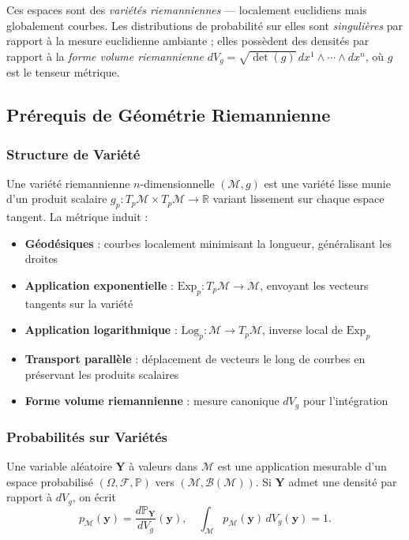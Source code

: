 \documentclass[11pt,a4paper]{article}
\begin{document}
Ces espaces sont des \textit{variétés riemanniennes} --- localement euclidiens mais globalement courbes. Les distributions de probabilité sur elles sont \textit{singulières} par rapport à la mesure euclidienne ambiante ; elles possèdent des densités par rapport à la \textit{forme volume riemannienne} $dV_g = \sqrt{\det(g)}\, dx^1 \wedge \cdots \wedge dx^n$, où $g$ est le tenseur métrique.

\subsection{Prérequis de Géométrie Riemannienne}

\subsubsection{Structure de Variété}
Une variété riemannienne $n$-dimensionnelle $(\mathcal{M}, g)$ est une variété lisse munie d'un produit scalaire $g_p: T_p\mathcal{M} \times T_p\mathcal{M} \to \mathbb{R}$ variant lissement sur chaque espace tangent. La métrique induit :
\begin{itemize}
    \item \textbf{Géodésiques} : courbes localement minimisant la longueur, généralisant les droites
    \item \textbf{Application exponentielle} : $\text{Exp}_p: T_p\mathcal{M} \to \mathcal{M}$, envoyant les vecteurs tangents sur la variété
    \item \textbf{Application logarithmique} : $\text{Log}_p: \mathcal{M} \to T_p\mathcal{M}$, inverse local de $\text{Exp}_p$
    \item \textbf{Transport parallèle} : déplacement de vecteurs le long de courbes en préservant les produits scalaires
    \item \textbf{Forme volume riemannienne} : mesure canonique $dV_g$ pour l'intégration
\end{itemize}

\subsubsection{Probabilités sur Variétés}
Une variable aléatoire $\mathbf{Y}$ à valeurs dans $\mathcal{M}$ est une application mesurable d'un espace probabilisé $(\Omega, \mathcal{F}, \mathbb{P})$ vers $(\mathcal{M}, \mathcal{B}(\mathcal{M}))$. Si $\mathbf{Y}$ admet une densité par rapport à $dV_g$, on écrit
\begin{equation}
    p_{\mathcal{M}}(\mathbf{y}) = \frac{d\mathbb{P}_{\mathbf{Y}}}{dV_g}(\mathbf{y}), \quad \int_{\mathcal{M}} p_{\mathcal{M}}(\mathbf{y})\, dV_g(\mathbf{y}) = 1.
\end{equation}
\end{document}
